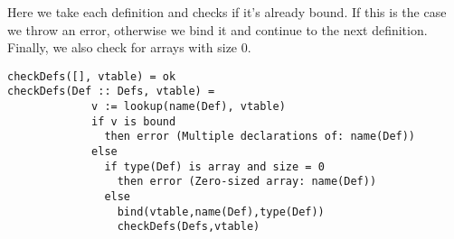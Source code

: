 Here we take each definition and checks if it's already bound.
If this is the case we throw an error, otherwise we bind it and
continue to the next definition. Finally, we also check for arrays
with size 0. \\

\begin{verbatim}
checkDefs([], vtable) = ok
checkDefs(Def :: Defs, vtable) =
             v := lookup(name(Def), vtable)
             if v is bound
               then error (Multiple declarations of: name(Def))
             else
               if type(Def) is array and size = 0
                 then error (Zero-sized array: name(Def))
               else
                 bind(vtable,name(Def),type(Def))
                 checkDefs(Defs,vtable)
\end{verbatim}

